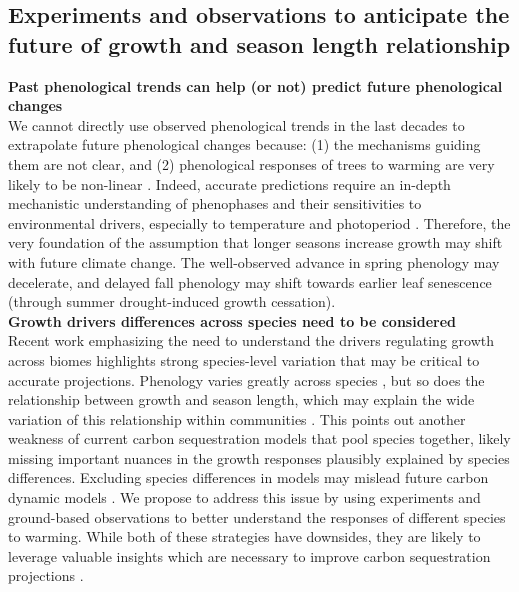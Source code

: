 \documentclass{article}
\begin{document}
\subsection*{Experiments and observations to anticipate the future of growth and season length relationship} 
\textbf{Past phenological trends can help (or not) predict future phenological changes} \\ 
We cannot directly use observed phenological trends in the last decades to extrapolate future phenological changes because: (1) the mechanisms guiding them are not clear, and (2) phenological responses of trees to warming are very likely to be non-linear \citep{ettinger_winter_2020,fu_sensitivity_2013}. Indeed, accurate predictions require an in-depth mechanistic understanding of phenophases and their sensitivities to environmental drivers, especially to temperature and photoperiod \citep{fu_sensitivity_2013}. Therefore, the very foundation of the assumption that longer seasons increase growth may shift with future climate change. The well-observed advance in spring phenology may decelerate, and delayed fall phenology may shift towards earlier leaf senescence (through summer drought-induced growth cessation). \\

\textbf{Growth drivers differences across species need to be considered} \\ 
Recent work emphasizing the need to understand the drivers regulating growth across biomes highlights strong species-level variation that may be critical to accurate projections. Phenology varies greatly across species \cite[e.g., closely related species tend to budburst at similar times under similar conditions][]{wolkovich_progress_2014}, but so does the relationship between growth and season length, which may explain the wide variation of this relationship within communities \citep{buckley_functional_2012}. This points out another weakness of current carbon sequestration models that pool species together, likely missing important nuances in the growth responses plausibly explained by species differences. Excluding species differences in models may mislead future carbon dynamic models \citep{green_limits_2022,cabon_cross-biome_2022,wolkovich_why_2025}. We propose to address this issue by using experiments and ground-based observations to better understand the responses of different species to warming. While both of these strategies have downsides, they are likely to leverage valuable insights which are necessary to improve carbon sequestration projections \citep{wolkovich_why_2025}. \\ 
\end{document}
